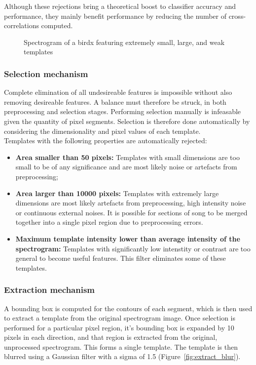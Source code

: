Although these rejections bring a theoretical boost to classifier accuracy and
performance, they mainly benefit performance by reducing the number of
cross-correlations computed.

\begin{figure}[h]
  \centering
  \caption{Spectrogram of a birdx featuring extremely small, large, and weak
  templates}
\end{figure}

\subsubsection{Selection mechanism}
Complete elimination of all undesireable features is impossible without also
removing desireable features.
A balance must therefore be struck, in both preprocessing and selection stages.
Performing selection manually is infeasable given the quantity
of pixel segments.
Selection is therefore done automatically by considering the dimensionality and
pixel values of each template.\\

Templates with the following properties are automatically rejected:
\begin{itemize}[noitemsep]
  \item \textbf{Area smaller than 50 pixels:} Templates with small dimensions
    are too small to be of any significance and are most likely noise or
    artefacts from preprocessing;

  \item \textbf{Area larger than 10000 pixels:} Templates with extremely large
    dimensions are most likely artefacts from preprocessing, high intensity
    noise or continuous external noises.
    It is possible for sections of song to be merged together into a single
    pixel region due to preprocessing errors.

  \item \textbf{Maximum template intensity lower than average intensity of the
    spectrogram:}
    Templates with significantly low intenstity or contrast are too general to
    become useful features.
    This filter eliminates some of these templates.
\end{itemize}


\subsubsection{Extraction mechanism}\label{sec:extract}

A bounding box is computed for the contours of each segment, which is then used
to extract a template from the original spectrogram image.
Once selection is performed for a particular pixel region, it's bounding box is
expanded by 10 pixels in each direction, and that region is extracted from the
original, unprocessed spectrogram.
This forms a single template.
The template is then blurred using a Gaussian filter with a sigma of 1.5
(Figure~\ref{fig:extract_blur}).

